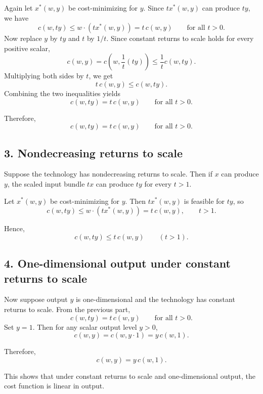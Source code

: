 Again let \(x^*(w,y)\) be cost-minimizing for \(y\). Since \(t x^*(w,y)\) can produce \(ty\), we have
\[
c(w,ty)\le w\cdot (t x^*(w,y))=t\,c(w,y)
\qquad \text{for all } t>0.
\]
Now replace \(y\) by \(ty\) and \(t\) by \(1/t\). Since constant returns to scale holds for every positive scalar,
\[
c(w,y)=c\!\left(w,\frac{1}{t}(ty)\right)\le \frac{1}{t}c(w,ty).
\]
Multiplying both sides by \(t\), we get
\[
t\,c(w,y)\le c(w,ty).
\]
Combining the two inequalities yields
\[
c(w,ty)=t\,c(w,y)
\qquad \text{for all } t>0.
\]

Therefore,
\[
\boxed{c(w,ty)=t\,c(w,y)\qquad \text{for all } t>0.}
\]

\subsection*{3. Nondecreasing returns to scale}

Suppose the technology has nondecreasing returns to scale.  
Then if \(x\) can produce \(y\), the scaled input bundle \(tx\) can produce \(ty\) for every \(t>1\).

Let \(x^*(w,y)\) be cost-minimizing for \(y\). Then \(t x^*(w,y)\) is feasible for \(ty\), so
\[
c(w,ty)\le w\cdot (t x^*(w,y))=t\,c(w,y),
\qquad t>1.
\]

Hence,
\[
\boxed{c(w,ty)\le t\,c(w,y)\qquad (t>1).}
\]

\subsection*{4. One-dimensional output under constant returns to scale}

Now suppose output \(y\) is one-dimensional and the technology has constant returns to scale. From the previous part,
\[
c(w,ty)=t\,c(w,y)
\qquad \text{for all } t>0.
\]
Set \(y=1\). Then for any scalar output level \(y>0\),
\[
c(w,y)=c(w,y\cdot 1)=y\,c(w,1).
\]

Therefore,
\[
\boxed{c(w,y)=y\,c(w,1).}
\]

This shows that under constant returns to scale and one-dimensional output, the cost function is linear in output.



